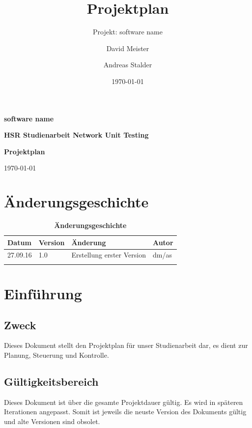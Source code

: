 \documentclass[a4,12pt]{scrartcl}
\title{Projektplan}
\subtitle{Projekt: software name}
\author{David Meister \and Andreas Stalder}
\date{\today}
\begin{document}
\begin{titlepage}
	\centering
	\vspace{5cm}
	\begin{center}
	\end{center}
	{\huge\bfseries software name\par}
	\vspace{8cm}
	\raggedright
	{\bfseries HSR Studienarbeit Network Unit Testing\par}
	{\huge\bfseries Projektplan\par}
	\vspace{1cm}
	{\theauthor \par}
	{\today\par}

\end{titlepage}

\section{Änderungsgeschichte}

\begin{table}[htb]
\centering
    \begin{tabular}{@{} l l l l@{}}\toprule    
    {Datum} & {Version} & {Änderung} & {Autor}\\ \midrule
    27.09.16 & 1.0 & Erstellung erster Version & dm/as\\ \addlinespace
    \end{tabular}
\caption{\textbf{Änderungsgeschichte}}
\end{table}

\newpage

\tableofcontents
\newpage


\section{Einführung}
\subsection{Zweck}
Dieses Dokument stellt den Projektplan für unser Studienarbeit dar, es dient zur Planung, Steuerung und Kontrolle.
\subsection{Gültigkeitsbereich}
Dieses Dokument ist über die gesamte Projektdauer gültig. Es wird in späteren Iterationen angepasst. Somit ist jeweils die neuste Version des Dokuments gültig und alte Versionen sind obsolet.
\end{document}
